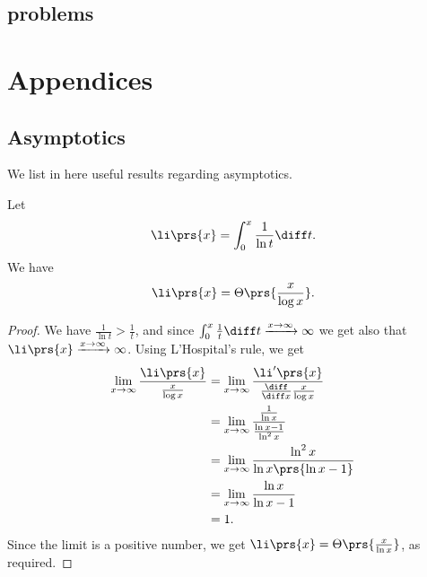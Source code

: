 \documentclass[oneside]{scrbook}
\theoremstyle{definition}
\begin{document}
\begin{exercise}
\end{exercise}

\section{problems}

\begin{problem}
\end{problem}

\begin{problem}
\end{problem}


\appendix

\chapter{Appendices}
\section{Asymptotics}

We list in here useful results regarding asymptotics.

\begin{lemma} \label{lemma:li-asymptotics}
Let
\begin{align*}
\li\prs{x} = \int_0^x \frac{1}{\ln t} \diff t \text{.}
\end{align*}
We have
\begin{align*}
\li\prs{x} = \Theta\prs{\frac{x}{\log x}} \text{.}
\end{align*}
\end{lemma}

\begin{proof}
We have $\frac{1}{\ln t} > \frac{1}{t}$, and since $\int_0^x \frac{1}{t} \diff t \xrightarrow{x \to \infty} \infty$ we get also that $\li\prs{x} \xrightarrow{x\to\infty} \infty$.
Using L'Hospital's rule, we get
\begin{align*}
\lim_{x\to\infty} \frac{\li\prs{x}}{\frac{x}{\log x}} &= \lim_{x\to\infty} \frac{\li'\prs{x}}{\frac{\diff}{\diff x}\frac{x}{\log x}}
\\&=
\lim_{x\to\infty} \frac{\frac{1}{\ln x}}{\frac{\ln x - 1}{\ln^2 x}}
\\&=
\lim_{x\to\infty} \frac{\ln^2 x}{\ln x \prs{\ln x - 1}}
\\&=
\lim_{x\to\infty} \frac{\ln x}{\ln x - 1}
\\&= 1 \text{.}
\end{align*}
Since the limit is a positive number, we get $\li\prs{x} = \Theta\prs{\frac{x}{\ln x}}$, as required.
\end{proof}
\end{document}
